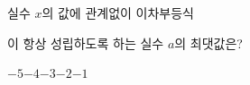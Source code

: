 \hspace*{2mm}\begin{minipage}[t]{\dimexpr\linewidth-2mm\relax}\vspace{0pt}
실수 $x$의 값에 관계없이 이차부등식\par\smallskip{}\par\smallskip\noindent 이 항상 성립하도록 하는 실수 $a$의 최댓값은?
\begin{choices32}{$-5$}{$-4$}{$-3$}{$-2$}{$-1$}\end{choices32}\end{minipage}
